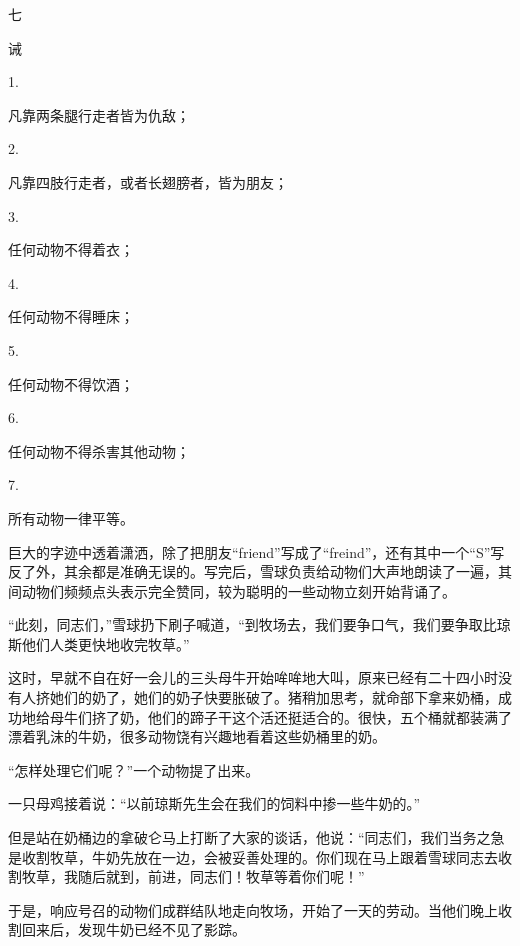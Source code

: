 七

诫

1.

凡靠两条腿行走者皆为仇敌；

2.

凡靠四肢行走者，或者长翅膀者，皆为朋友；

3.

任何动物不得着衣；

4.

任何动物不得睡床；

5.

任何动物不得饮酒；

6.

任何动物不得杀害其他动物；

7.

所有动物一律平等。

巨大的字迹中透着潇洒，除了把朋友“friend”写成了“freind”，还有其中一个“S”写反了外，其余都是准确无误的。写完后，雪球负责给动物们大声地朗读了一遍，其间动物们频频点头表示完全赞同，较为聪明的一些动物立刻开始背诵了。

“此刻，同志们，”雪球扔下刷子喊道，“到牧场去，我们要争口气，我们要争取比琼斯他们人类更快地收完牧草。”

这时，早就不自在好一会儿的三头母牛开始哞哞地大叫，原来已经有二十四小时没有人挤她们的奶了，她们的奶子快要胀破了。猪稍加思考，就命部下拿来奶桶，成功地给母牛们挤了奶，他们的蹄子干这个活还挺适合的。很快，五个桶就都装满了漂着乳沫的牛奶，很多动物饶有兴趣地看着这些奶桶里的奶。

“怎样处理它们呢？”一个动物提了出来。

一只母鸡接着说：“以前琼斯先生会在我们的饲料中掺一些牛奶的。”

但是站在奶桶边的拿破仑马上打断了大家的谈话，他说：“同志们，我们当务之急是收割牧草，牛奶先放在一边，会被妥善处理的。你们现在马上跟着雪球同志去收割牧草，我随后就到，前进，同志们！牧草等着你们呢！”

于是，响应号召的动物们成群结队地走向牧场，开始了一天的劳动。当他们晚上收割回来后，发现牛奶已经不见了影踪。
